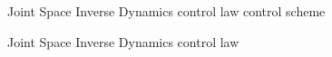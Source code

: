 \documentclass{article}
\begin{document}
\begin{figure}[H]
    \noindent

    \caption{Joint Space Inverse Dynamics control law control scheme}
    \label{fig:js_Inverse_dynamics_scheme}
\end{figure}


\begin{figure}[H]
    \noindent

    \caption{Joint Space Inverse Dynamics control law}
    \label{fig:js_Inverse_dynamics_joints}
\end{figure}
\end{document}
